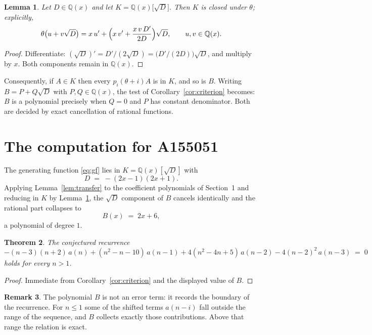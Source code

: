 \documentclass[11pt,a4paper]{article}
\theoremstyle{plain}
\newtheorem{theorem}{Theorem}
\newtheorem{lemma}[theorem]{Lemma}
\theoremstyle{definition}
\newtheorem{remark}[theorem]{Remark}
\begin{document}
\begin{lemma}\label{lem:field}
Let $D\in\mathbb{Q}(x)$ and let $K=\mathbb{Q}(x)\bigl[\sqrt{D}\bigr]$. Then $K$ is closed
under $\theta$; explicitly,
\[
\theta\bigl(u+v\sqrt{D}\bigr)=x\,u'+\Bigl(x\,v'+\frac{x\,v\,D'}{2D}\Bigr)\sqrt{D},
\qquad u,v\in\mathbb{Q}(x).
\]
\end{lemma}

\begin{proof}
Differentiate: $(\sqrt{D})'=D'/(2\sqrt{D})=\bigl(D'/(2D)\bigr)\sqrt{D}$, and multiply by
$x$. Both components remain in $\mathbb{Q}(x)$.
\end{proof}

Consequently, if $A\in K$ then every $p_{i}(\theta+i)A$ is in $K$, and so is $B$. Writing
$B=P+Q\sqrt{D}$ with $P,Q\in\mathbb{Q}(x)$, the test of Corollary~\ref{cor:criterion}
becomes: $B$ is a polynomial precisely when $Q=0$ and $P$ has constant denominator. Both
are decided by exact cancellation of rational functions.

\section{The computation for A155051}

The generating function \eqref{eq:gf} lies in $K=\mathbb{Q}(x)[\sqrt{D}]$ with
\[
D \;=\; - \left(2 x - 1\right) \left(2 x + 1\right) .
\]
Applying Lemma~\ref{lem:transfer} to the coefficient polynomials of Section~1 and reducing
in $K$ by Lemma~\ref{lem:field}, the $\sqrt{D}$ component of $B$ cancels identically and
the rational part collapses to
\[
B(x)\;=\;2 x + 6 ,
\]
a polynomial of degree $1$.

\begin{theorem}
The conjectured recurrence
\[
- \left(n - 3\right) \left(n + 2\right)\,a(n) + (n^{2} - n - 10)\,a(n-1) + 4 \left(n^{2} - 4 n + 5\right)\,a(n-2) -  4 \left(n - 2\right)^{2}\,a(n-3) \;=\;0
\]
holds for every $n>1$.
\end{theorem}

\begin{proof}
Immediate from Corollary~\ref{cor:criterion} and the displayed value of $B$.
\end{proof}

\begin{remark}
The polynomial $B$ is not an error term: it records the boundary of the recurrence. For
$n\le1$ some of the shifted terms $a(n-i)$ fall outside the range of the sequence,
and $B$ collects exactly those contributions. Above that range the relation is exact.
\end{remark}
\end{document}
